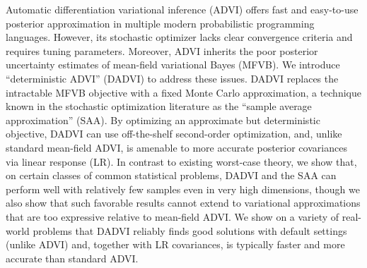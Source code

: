 Automatic differentiation variational inference (ADVI) offers fast and
easy-to-use posterior approximation in multiple modern probabilistic programming
languages. However, its stochastic optimizer lacks clear convergence criteria
and requires tuning parameters. Moreover, ADVI inherits the poor posterior
uncertainty estimates of mean-field variational Bayes (MFVB).  We introduce
``deterministic ADVI'' (DADVI) to address these issues. DADVI replaces the
intractable MFVB objective with a fixed Monte Carlo approximation, a technique
known in the stochastic optimization literature as the ``sample average
approximation'' (SAA).  By optimizing an approximate but deterministic
objective, DADVI can use off-the-shelf second-order optimization, and, unlike
standard mean-field ADVI, is amenable to more accurate posterior covariances
via linear response (LR).  In contrast to existing worst-case theory, we show
that, on certain classes of common statistical problems, DADVI and the SAA can
perform well with relatively few samples even in very high dimensions, though we
also show that such favorable results cannot extend to variational
approximations that are too expressive relative to mean-field ADVI. We show on a
variety of real-world problems that DADVI reliably finds good solutions with
default settings (unlike ADVI) and, together with LR covariances, is typically
faster and more accurate than standard ADVI.
